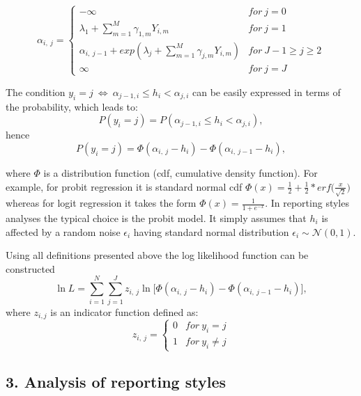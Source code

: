 \documentclass[]{article}
\begin{document}
\begin{equation}
\label{eq:3}
\alpha_{i,~j} =\begin{cases} -\infty& for~j=0 \\
  \lambda_{1} + \sum_{m=1}^{M} \gamma_{1,m} Y_{i,m} &for~j=1\\ 
 \alpha_{i,~j-1} +exp(\lambda_{j}+\sum_{m=1}^M \gamma_{j,m} Y_{i,m})&for~J-1 \ge j\ge2\\
 \infty& for~j=J
\end{cases}
\end{equation}

The condition
\(y_i = j~ \Leftrightarrow~ \alpha_{j-1,i} \leq h_i < \alpha_{j,i}\) can
be easily expressed in terms of the probability, which leads to:
\begin{equation}
\label{eq:4}
P(y_i = j) = P(\alpha_{j-1,i} \leq h_i < \alpha_{j,i}),
\end{equation} hence \begin{equation}
\label{eq:5}
P(y_i = j) = \Phi(\alpha_{i,~j}-h_{i})-\Phi(\alpha_{i,~j-1}-h_{i}),
\end{equation}

where \(\Phi\) is a distribution function (cdf, cumulative density
function). For example, for probit regression it is standard normal cdf
\(\Phi(x)=\frac{1}{2}+\frac{1}{2}*erf \Big(\frac{x}{\sqrt 2}\Big)\)
whereas for logit regression it takes the form
\(\Phi(x)=\frac{1}{1+e^{-x}}\). In reporting styles analyses the typical
choice is the probit model. It simply assumes that \(h_i\) is affected
by a random noise \(\epsilon_i\) having standard normal distribution
\(\epsilon_i\sim \mathcal{N}(0,1)\).

Using all definitions presented above the log likelihood function can be
constructed \begin{equation}
\label{eq:6}
\ln L = \sum_{i=1}^N \sum_{j=1}^J z_{i,~j} \ln\Big[\Phi(\alpha_{i,~j}-h_{i})-\Phi(\alpha_{i,~j-1}-h_{i})\Big],
\end{equation} where \(z_{i,j}\) is an indicator function defined as:
\begin{equation}
\label{eq:7}
z_{i,~j} =\begin{cases} 0&for~ y_i=j\\ 1&for~y_i\ne j\end{cases}
\end{equation}

\hypertarget{analysis-of-reporting-styles}{%
\subsection{3. Analysis of reporting
styles}\label{analysis-of-reporting-styles}}
\end{document}
